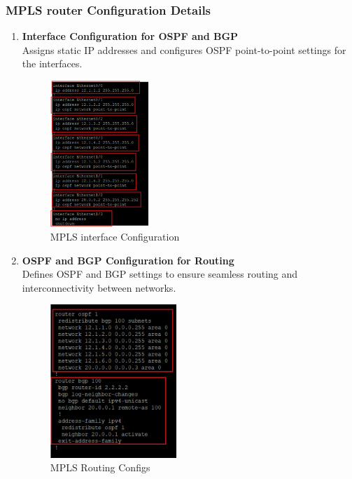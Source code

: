 \documentclass[12pt,english]{report}
\begin{document}
\subsubsection{MPLS router Configuration Details}
\begin{enumerate}
    \item \textbf{Interface Configuration for OSPF and BGP} \\
    Assigns static IP addresses and configures OSPF point-to-point settings for the interfaces.
\begin{figure}[H]
    \centering
    \includegraphics[width= 0.35\textwidth]{chapitre 3/4.png}
    \caption{MPLS interface Configuration}
    \label{fig: MPLS interface Configuration}
\end{figure}
    \item \textbf{OSPF and BGP Configuration for Routing} \\
    Defines OSPF and BGP settings to ensure seamless routing and interconnectivity between networks.
\begin{figure}[H]
    \centering
    \includegraphics[width= 0.45\textwidth]{chapitre 3/5.png}
    \caption{MPLS Routing Configs}
    \label{fig: MPLS Routing Configs}
\end{figure}
\end{enumerate}
\end{document}
